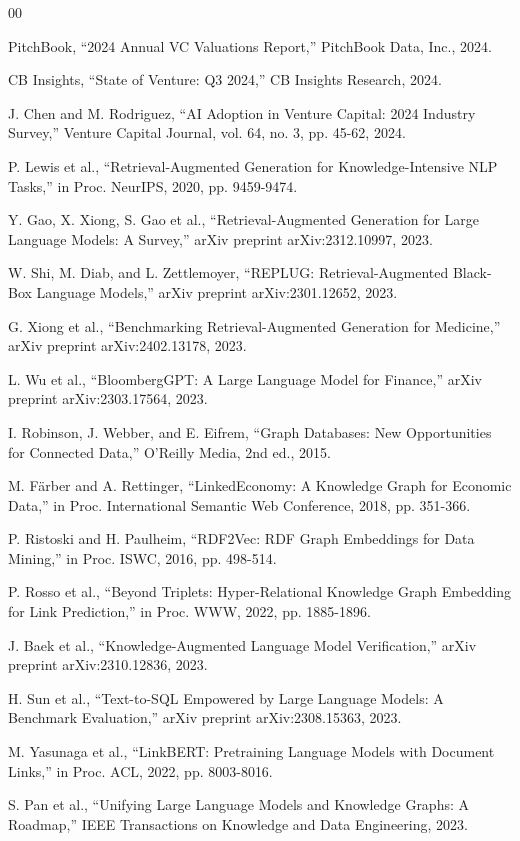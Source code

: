 \documentclass[11pt,twocolumn]{article}
\begin{document}
\begin{thebibliography}{00}

PitchBook, ``2024 Annual VC Valuations Report,'' PitchBook Data, Inc., 2024.

CB Insights, ``State of Venture: Q3 2024,'' CB Insights Research, 2024.

J. Chen and M. Rodriguez, ``AI Adoption in Venture Capital: 2024 Industry Survey,'' Venture Capital Journal, vol. 64, no. 3, pp. 45-62, 2024.

P. Lewis et al., ``Retrieval-Augmented Generation for Knowledge-Intensive NLP Tasks,'' in Proc. NeurIPS, 2020, pp. 9459-9474.

Y. Gao, X. Xiong, S. Gao et al., ``Retrieval-Augmented Generation for Large Language Models: A Survey,'' arXiv preprint arXiv:2312.10997, 2023.

W. Shi, M. Diab, and L. Zettlemoyer, ``REPLUG: Retrieval-Augmented Black-Box Language Models,'' arXiv preprint arXiv:2301.12652, 2023.

G. Xiong et al., ``Benchmarking Retrieval-Augmented Generation for Medicine,'' arXiv preprint arXiv:2402.13178, 2023.

L. Wu et al., ``BloombergGPT: A Large Language Model for Finance,'' arXiv preprint arXiv:2303.17564, 2023.

I. Robinson, J. Webber, and E. Eifrem, ``Graph Databases: New Opportunities for Connected Data,'' O'Reilly Media, 2nd ed., 2015.

M. Färber and A. Rettinger, ``LinkedEconomy: A Knowledge Graph for Economic Data,'' in Proc. International Semantic Web Conference, 2018, pp. 351-366.

P. Ristoski and H. Paulheim, ``RDF2Vec: RDF Graph Embeddings for Data Mining,'' in Proc. ISWC, 2016, pp. 498-514.

P. Rosso et al., ``Beyond Triplets: Hyper-Relational Knowledge Graph Embedding for Link Prediction,'' in Proc. WWW, 2022, pp. 1885-1896.

J. Baek et al., ``Knowledge-Augmented Language Model Verification,'' arXiv preprint arXiv:2310.12836, 2023.

H. Sun et al., ``Text-to-SQL Empowered by Large Language Models: A Benchmark Evaluation,'' arXiv preprint arXiv:2308.15363, 2023.

M. Yasunaga et al., ``LinkBERT: Pretraining Language Models with Document Links,'' in Proc. ACL, 2022, pp. 8003-8016.

S. Pan et al., ``Unifying Large Language Models and Knowledge Graphs: A Roadmap,'' IEEE Transactions on Knowledge and Data Engineering, 2023.

\end{thebibliography}
\end{document}

